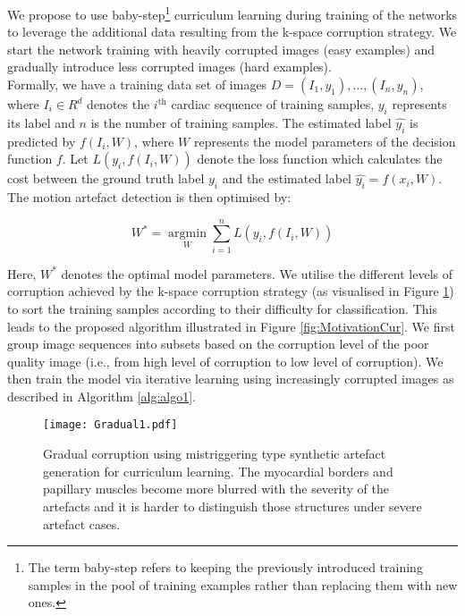 \documentclass[preprint,12pt,authoryear]{elsarticle}
\begin{document}
We propose to use baby-step\footnote{The term baby-step refers to keeping the previously introduced training samples in the pool of training examples rather than replacing them with new ones.} curriculum learning during training of the networks to leverage the additional data resulting from the k-space corruption strategy. We start the network training with heavily corrupted images (easy examples) and gradually introduce less corrupted images (hard examples). \\

Formally, we have a training data set of images $D={(I_{1},y_{1}), \dots, (I_{n},y_{n})} $, where $I_{i} \in R^{d}$ denotes the $i^{\text{th}}$ cardiac sequence of training samples, $y_{i}$ represents its label and $n$ is the number of training samples. The estimated label $\hat{y_{i}}$  is predicted by $f(I_{i},W)$, where $W$ represents the model parameters of the decision function $f$. Let $L(y_{i}, f(I_{i}, W))$ denote the loss function which calculates the cost between the ground truth label $y_{i}$ and the estimated label $\hat{y_{i}}=f(x_{i},W)$. The motion artefact detection is then optimised by:

$$ W^{*}= \underset{W}{\operatorname{argmin}} \sum_{i=1}^n L(y_{i}, f(I_{i}, W)) $$

Here, $W^{*}$ denotes the optimal model parameters. We utilise the different levels of corruption achieved by the k-space corruption strategy (as visualised in Figure \ref{fig:Gradual}) to sort the training samples according to their difficulty for classification.  This leads to the proposed algorithm illustrated in Figure \ref{fig:MotivationCur}. We first group image sequences into subsets based on the corruption level of the poor quality image (i.e., from high level of corruption to low level of corruption). We then train the model via iterative learning using increasingly corrupted images as described in Algorithm \ref{alg:algo1}.

 \begin{figure}[tb]
  \centering
  \centerline{\texttt{[image: Gradual1.pdf]}}
\caption{Gradual corruption using mistriggering type synthetic artefact generation for curriculum learning. The myocardial borders and papillary muscles become more blurred with the severity of the artefacts and it is harder to distinguish those structures under severe artefact cases.}
\label{fig:Gradual}
\end{figure}
 
\end{document}
